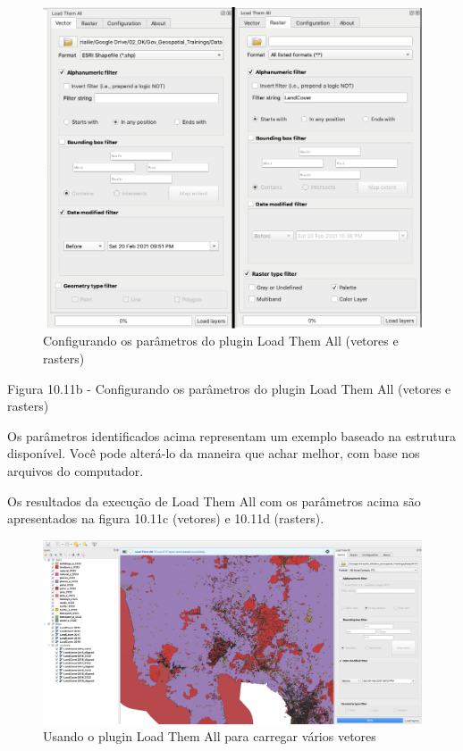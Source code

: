 \documentclass[
]{krantz}
\begin{document}
\begin{figure}
\centering
\includegraphics{media/modulo10/fig1011_b.png}
\caption{Configurando os parâmetros do plugin Load Them All (vetores e rasters)}
\end{figure}

Figura 10.11b - Configurando os parâmetros do plugin Load Them All (vetores e rasters)

Os parâmetros identificados acima representam um exemplo baseado na estrutura disponível. Você pode alterá-lo da maneira que achar melhor, com base nos arquivos do computador.

Os resultados da execução de Load Them All com os parâmetros acima são apresentados na figura 10.11c (vetores) e 10.11d (rasters).

\begin{figure}
\centering
\includegraphics{media/modulo10/fig1011_c.png}
\caption{Usando o plugin Load Them All para carregar vários vetores}
\end{figure}
\end{document}
